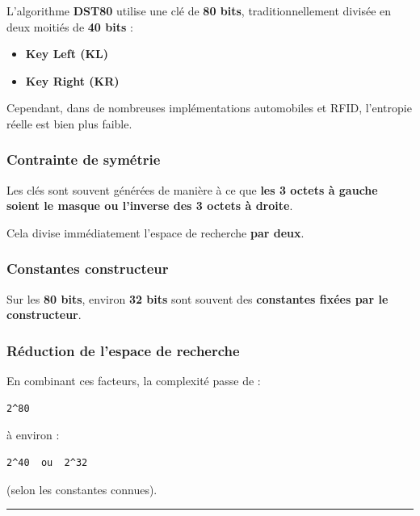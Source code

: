 \documentclass[
  french,
]{article}
\providecommand{\tightlist}{%
  \setlength{\itemsep}{0pt}\setlength{\parskip}{0pt}}
\begin{document}
L'algorithme \textbf{DST80} utilise une clé de \textbf{80 bits},
traditionnellement divisée en deux moitiés de \textbf{40 bits} :

\begin{itemize}
\tightlist
\item
  \textbf{Key Left (KL)}
\item
  \textbf{Key Right (KR)}
\end{itemize}

Cependant, dans de nombreuses implémentations automobiles et RFID,
l'entropie réelle est bien plus faible.

\subsubsection{Contrainte de symétrie}\label{contrainte-de-symuxe9trie}

Les clés sont souvent générées de manière à ce que \textbf{les 3 octets
à gauche soient le masque ou l'inverse des 3 octets à droite}.

Cela divise immédiatement l'espace de recherche \textbf{par deux}.

\subsubsection{Constantes constructeur}\label{constantes-constructeur-1}

Sur les \textbf{80 bits}, environ \textbf{32 bits} sont souvent des
\textbf{constantes fixées par le constructeur}.

\subsubsection{Réduction de l'espace de
recherche}\label{ruxe9duction-de-lespace-de-recherche}

En combinant ces facteurs, la complexité passe de :

\begin{verbatim}
2^80
\end{verbatim}

à environ :

\begin{verbatim}
2^40  ou  2^32
\end{verbatim}

(selon les constantes connues).

\begin{center}\rule{0.5\linewidth}{0.5pt}\end{center}
\end{document}
